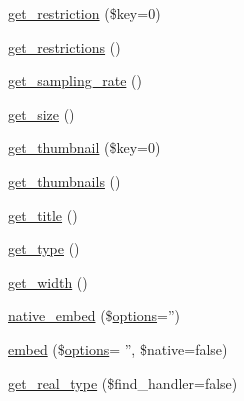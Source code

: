 \begin{DoxyCompactItemize}
\item 
\hyperlink{class_simple_pie___enclosure_a586419af21c26ccbf3e47213afd950d4}{get\-\_\-restriction} (\$key=0)
\item 
\hyperlink{class_simple_pie___enclosure_a7e380fe73efe1634413feba64809b175}{get\-\_\-restrictions} ()
\item 
\hyperlink{class_simple_pie___enclosure_a372b18c4e4783935fd5838e9b9f483a9}{get\-\_\-sampling\-\_\-rate} ()
\item 
\hyperlink{class_simple_pie___enclosure_aeb26b2f137fa861df08ef9fc721dfb84}{get\-\_\-size} ()
\item 
\hyperlink{class_simple_pie___enclosure_a08cb6683a613f684c7815fb402444956}{get\-\_\-thumbnail} (\$key=0)
\item 
\hyperlink{class_simple_pie___enclosure_a688bdf7a822972a2306ee1fb081b4278}{get\-\_\-thumbnails} ()
\item 
\hyperlink{class_simple_pie___enclosure_add7d106008f31eca2dc694327f6bbe15}{get\-\_\-title} ()
\item 
\hyperlink{class_simple_pie___enclosure_ae5843309a6eacb6eceb51ab6a78d9545}{get\-\_\-type} ()
\item 
\hyperlink{class_simple_pie___enclosure_ab1069e8ffc0d7922a46678175a927134}{get\-\_\-width} ()
\item 
\hyperlink{class_simple_pie___enclosure_afd8ab017271ad625b9156e1c2a6b4e9a}{native\-\_\-embed} (\$\hyperlink{classoptions}{options}='')
\item 
\hyperlink{class_simple_pie___enclosure_a171c729bb673362252cb60a05074d6b1}{embed} (\$\hyperlink{classoptions}{options}= '', \$native=false)
\item 
\hyperlink{class_simple_pie___enclosure_a41b8462351ecaa25f01069490f10f5b1}{get\-\_\-real\-\_\-type} (\$find\-\_\-handler=false)
\end{DoxyCompactItemize}
